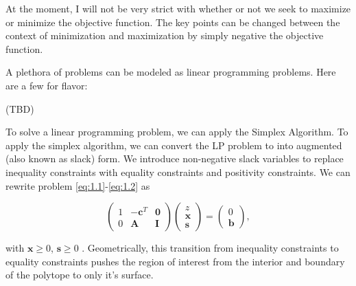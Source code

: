 \documentclass[12pt,english]{article}
\begin{document}
At the moment, I will not be very strict with whether or not we seek to maximize or minimize the objective function.  The key points can be changed between the context of minimization and maximization by simply negative the objective function.

A plethora of problems can be modeled as linear programming problems.  Here are a few for flavor:

(TBD)

To solve a linear programming problem, we can apply the Simplex Algorithm.   To apply the simplex algorithm, we can convert the LP problem to into augmented (also known as slack) form.  We introduce non-negative slack variables to replace inequality constraints with equality constraints and positivity constraints.   We can rewrite problem \eqref{eq:1.1}-\eqref{eq:1.2} as

\begin{equation}\label{eq:2.1}
\left(
\begin{array}{ccc}
1	&	-\mathbf{c}^T 	&	\mathbf{0} 	\\
0	&	\mathbf{A}		& 	\mathbf{I}
\end{array}
\right)
\left(
\begin{array}{c}
z \\
\mathbf{x} \\
\mathbf{s}
\end{array}
\right)
= 
\left(
\begin{array}{c}
0 \\
\mathbf{b}
\end{array}
\right),
\end{equation}

with $\mathbf{x} \geq 0$, $\mathbf{s} \geq 0$ \cite{Wiki:LP}.  Geometrically, this transition from inequality constraints to equality constraints pushes the region of interest from the interior and boundary of the polytope to only it's surface.\\
\end{document}
